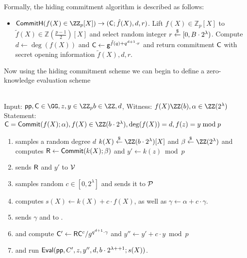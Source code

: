Formally, the hiding commitment algorithm is described as follows:
\begin{itemize}
	\item $\pro{CommitH}(f(X) \in \ZZ_p[X]) \rightarrow (\gr{C}; \hat{f}(X), d, r)$. Lift $f(X) \in \mathbb{Z}_p[X]$ to $\tilde{f}(X) \in \mathbb{Z}(\frac{p-1}{2})[X]$ and select random integer $r \overset{\$}{\gets} [0,B\cdot 2^\lambda)$. Compute $d \gets \deg(f(X))$ and $\mathsf{C} \gets \mathsf{g}^{\tilde{f}(q)+q^{d+1} \cdot r}$ and return commitment $\mathsf{C}$ with secret opening information $\tilde{f}(X), d, r$.
\end{itemize}
Now using the hiding commitment scheme we can begin to define a zero-knowledge evaluation scheme
 \noindent\begin{mdframed}[userdefinedwidth=\textwidth]
\begin{minipage}{\textwidth}
	\begin{flushleft}
	\\
	Input: $\crs,\gr{C} \in \GG,z,y \in \ZZ_p b\in \ZZ,d$, Witness: $f(X) \ZZ(b),\alpha \in \ZZ(2^\lambda)$\\
	Statement: $\gr{C}=\commit(f(X);\alpha),f(X) \in \ZZ(b\cdot 2^\lambda),\deg(f(X))=d, f(z)=y \bmod p$
	\begin{enumerate}[nolistsep]
		    \item \prover samples a random degree $d$ $k(X) \sample \ZZ(b\cdot 2^\lambda)[X]$ and $\beta \sample \ZZ(2^\lambda)$ and computes $\mathsf{R}\gets \textsf{{Commit}}(k(X);\beta)$ and $y'\gets k(z) \bmod p$
		    \item \prover sends $\mathsf{R}$ and $y'$ to $\mathcal{V}$
		    \item \verifier samples random $c\in [0,2^\lambda]$ and sends it to $\mathcal{P}$
		    \item \prover computes $s(X)\gets k(X) + c \cdot f(X)$, as well as $\gamma\gets \alpha+ c\cdot \gamma$. 
		    \item \prover sends $\gamma$ and to \verifier.
		    \item \prover and \verifier compute $\mathsf{C}'\gets \mathsf{R}\mathsf{C}^c/g^{q^{d+1}\cdot \gamma}$ and $y''\gets y'+c \cdot y \bmod p$
		    \item \prover and \verifier run $\textsf{{Eval}}(\textsf{pp},C',z,y'',d,b\cdot 2^{\lambda++1};s(X))$.
		   		\end{enumerate}
	\end{flushleft}
\end{minipage}
\end{mdframed}

